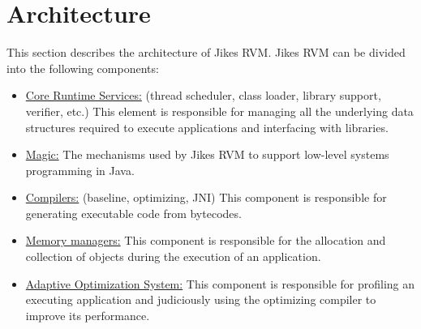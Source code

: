 \documentclass[a4paper,oneside]{book}
\begin{document}
























\part{Architecture}
\label{part:architecture}

This section describes the architecture of Jikes RVM. Jikes RVM can be divided into the following components:

\begin{itemize}
  \item \hyperref[cha:coreruntimeservices]{Core Runtime Services:} (thread scheduler, class loader, library support, verifier, etc.) This element is responsible for managing all the underlying data structures required to execute applications and interfacing with libraries.
  \item \hyperref[cha:magic]{Magic:} The mechanisms used by Jikes RVM to support low-level systems programming in Java.
  \item \hyperref[cha:compilers]{Compilers:} (baseline, optimizing, JNI) This component is responsible for generating executable code from bytecodes.
  \item \hyperref[cha:mmtk]{Memory managers:} This component is responsible for the allocation and collection of objects during the execution of an application.
  \item \hyperref[cha:adaptiveoptimizationsystem]{Adaptive Optimization System:} This component is responsible for profiling an executing application and judiciously using the optimizing compiler to improve its performance.
\end{itemize}




\end{document}
